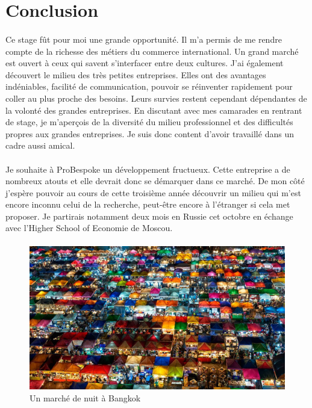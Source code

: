 \section*{Conclusion}

\paragraph{}
Ce stage fût pour moi une grande opportunité. Il m'a permis de me rendre compte de la richesse des métiers du commerce international. Un grand marché est ouvert à ceux qui savent s'interfacer entre deux cultures. J'ai également découvert le milieu des très petites entreprises. Elles ont des avantages indéniables, facilité de communication, pouvoir se réinventer rapidement pour coller au plus proche des besoins. Leurs survies restent cependant dépendantes de la volonté des grandes entreprises. En discutant avec mes camarades en rentrant de stage, je m'aperçois de la diversité du milieu professionnel et des difficultés propres aux grandes entreprises. Je suis donc content d'avoir travaillé dans un cadre aussi amical.
 \paragraph{}
 Je souhaite à ProBespoke un développement fructueux. Cette entreprise a de nombreux atouts et elle devrait donc se démarquer dans ce marché. De mon côté j'espère pouvoir au cours de cette troisième année découvrir un milieu qui m'est encore inconnu celui de la recherche, peut-être encore à l'étranger si cela met proposer. Je partirais notamment deux mois en Russie cet octobre en échange avec l'Higher School of Economie de Moscou.
 \paragraph{}
\begin{figure}[h]
\includegraphics[width=16cm]{image/marche.jpg}
\caption{Un marché de nuit à Bangkok}
\end{figure}
